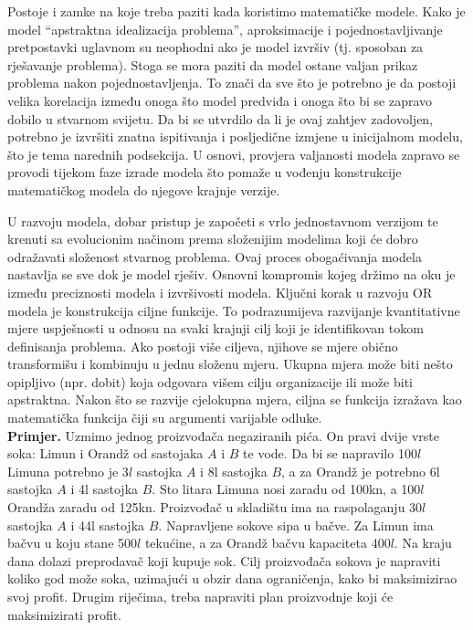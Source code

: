 \documentclass[a4paper, utf8, 11pt, colorlinks]{article}
\begin{document}
  Postoje i zamke na koje treba paziti kada koristimo matematičke modele. Kako je model ``apstraktna idealizacija problema'', aproksimacije i pojednostavljivanje pretpostavki uglavnom su neophodni ako je model izvršiv (tj. sposoban za rješavanje problema). Stoga se mora paziti da model ostane valjan prikaz problema nakon pojednostavljenja. To znači da 
  sve što je potrebno je da postoji velika korelacija između onoga što model predviđa i onoga što bi se zapravo dobilo u stvarnom svijetu. Da bi se utvrdilo da li je ovaj zahtjev zadovoljen, potrebno je izvršiti znatna ispitivanja i posljedične izmjene u inicijalnom modelu, što je tema narednih podsekcija. U osnovi, provjera valjanosti modela zapravo se provodi tijekom faze izrade modela što pomaže u vođenju konstrukcije matematičkog modela do njegove krajnje verzije. 
  
 U razvoju modela, dobar pristup je započeti s vrlo jednostavnom verzijom te   krenuti sa evolucionim načinom prema složenijim modelima koji će dobro odražavati složenost stvarnog problema. Ovaj proces obogaćivanja modela nastavlja se sve dok je model rješiv. Osnovni kompromis kojeg držimo na oku je između preciznosti modela i izvršivosti modela.
  Ključni korak u razvoju OR modela je konstrukcija ciljne funkcije.
To podrazumijeva razvijanje kvantitativne mjere uspješnosti u odnosu na svaki   krajnji cilj koji je identifikovan tokom definisanja problema.
Ako postoji više ciljeva, njihove se mjere obično transformišu
i kombinuju u jednu složenu mjeru.  Ukupna mjera može biti nešto opipljivo (npr. dobit) koja odgovara višem cilju
organizacije ili može biti apstraktna.  Nakon što se razvije cjelokupna mjera,  ciljna se funkcija izražava kao matematička funkcija čiji su argumenti varijable odluke. \vspace{0.3cm}\\
\textbf{Primjer.}  Uzmimo jednog proizvođa\v ca negaziranih pi\'ca. On pravi dvije vrste soka: Limun i Orandž od sastojaka $A$ i $B$ te vode. Da bi se napravilo 100$l$ Limuna potrebno je 3$l$
sastojka $A$ i 8l sastojka $B$, a za Orandž je potrebno 6l sastojka $A$ i 4l sastojka $B$. Sto litara Limuna nosi zaradu od 100kn, a 100$l$ Orandža zaradu od 125kn. Proizvođa\v c u skladi\v stu
ima na raspolaganju 30$l$ sastojka $A$ i 44l sastojka $B.$ Napravljene sokove sipa u ba\v cve. Za
Limun ima ba\v cvu u koju stane 500$l$ teku\' cine, a za Orandž ba\v cvu kapaciteta 400$l$. Na kraju dana dolazi preprodava\v c koji kupuje sok. Cilj proizvođa\v ca sokova je napraviti koliko god
mo\v ze soka, uzimaju\' ci u obzir dana ograni\v cenja, kako bi maksimizirao svoj profit. Drugim
rije\v cima, treba napraviti plan proizvodnje koji \' ce maksimizirati profit.
\end{document}
